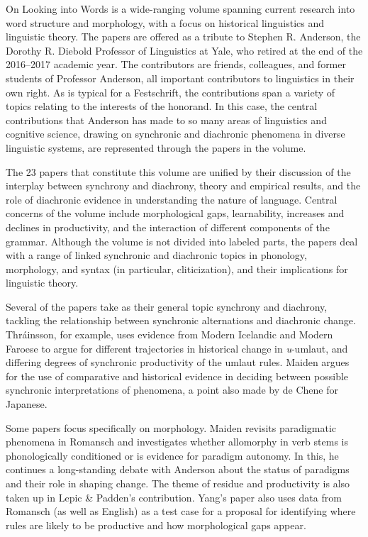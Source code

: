 \begin{refsection}

On Looking into Words is a wide-ranging volume spanning current research into word structure and morphology, with a focus on historical linguistics and linguistic theory. The papers are offered as a tribute to Stephen R. Anderson, the Dorothy R. Diebold Professor of Linguistics at Yale, who retired at the end of the 2016--2017 academic year. The contributors are friends, colleagues, and former students of Professor Anderson, all important contributors to linguistics in their own right. As is typical for a Festschrift, the contributions span a variety of topics relating to the interests of the honorand. In this case, the central contributions that Anderson has made to so many areas of linguistics and cognitive science, drawing on synchronic and diachronic phenomena in diverse linguistic systems, are represented through the papers in the volume. 

The 23 papers that constitute this volume are unified by their discussion of the interplay between synchrony and diachrony, theory and empirical results, and the role of diachronic evidence in understanding the nature of language. Central concerns of the volume include morphological gaps, learnability, increases and declines in productivity, and the interaction of different components of the grammar. Although the volume is not divided into labeled parts, the papers deal with a range of linked synchronic and diachronic topics in phonology, morphology, and syntax (in particular, cliticization), and their implications for linguistic theory. 

Several of the papers take as their general topic synchrony and diachrony, tackling the relationship between synchronic alternations and diachronic change. Thráinsson, for example, uses evidence from Modern Icelandic and Modern Faroese to argue for different trajectories in historical change in \emph{u}-umlaut, and differing degrees of synchronic productivity of the umlaut rules. Maiden argues for the use of comparative and historical evidence in deciding between possible synchronic interpretations of phenomena, a point also made by de Chene for Japanese. %

Some  papers focus specifically on morphology. Maiden revisits paradigmatic phenomena in Romansch and investigates whether allomorphy in verb stems is phonologically conditioned or is evidence for paradigm autonomy. In this, he continues a long-standing debate with Anderson about the status of paradigms and their role in shaping change. The theme of residue and productivity is also taken up in Lepic \& Padden’s contribution. Yang’s paper also uses data from Romansch (as well as English) as a test case for a proposal for identifying where rules are likely to be productive and how morphological gaps appear. 


\end{refsection}
